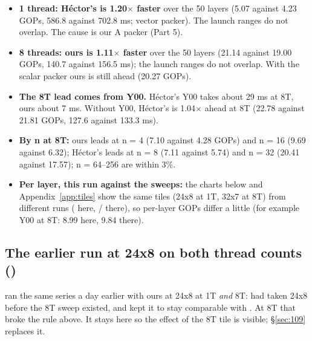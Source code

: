 \begin{itemize}\setlength\itemsep{1pt}
\item \textbf{1 thread: H\'ector's is 1.20$\times$ faster} over the 50 layers (5.07 against 4.23 GOPs, 586.8 against 702.8 ms; vector packer). The launch ranges do not overlap. The cause is our A packer (Part 5).
\item \textbf{8 threads: ours is 1.11$\times$ faster} over the 50 layers (21.14 against 19.00 GOPs, 140.7 against 156.5 ms); the launch ranges do not overlap. With the scalar packer ours is still ahead (20.27 GOPs).
\item \textbf{The 8T lead comes from Y00.} H\'ector's Y00 takes about 29 ms at 8T, ours about 7 ms. Without Y00, H\'ector's is 1.04$\times$ ahead at 8T (22.78 against 21.81 GOPs, 127.6 against 133.3 ms).
\item \textbf{By n at 8T:} ours leads at n = 4 (7.10 against 4.28 GOPs) and n = 16 (9.69 against 6.32); H\'ector's leads at n = 8 (7.11 against 5.74) and n = 32 (20.41 against 17.57); n = 64--256 are within 3\%.
\item \textbf{Per layer, this run against the sweeps:} the charts below and Appendix~\ref{app:tiles} show the same tiles (24x8 at 1T, 32x7 at 8T) from different runs ( here,  /  there), so per-layer GOPs differ a little (for example Y00 at 8T: 8.99 here, 9.84 there).
\end{itemize}



\clearpage
\subsection{The earlier run at 24x8 on both thread counts ()}\label{sec:94}
 ran the same series a day earlier with ours at 24x8 at 1T \emph{and} 8T:  had taken 24x8 before the 8T sweep existed, and  kept it to stay comparable with . At 8T that broke the rule above. It stays here so the effect of the 8T tile is visible; \S\ref{sec:109} replaces it.


